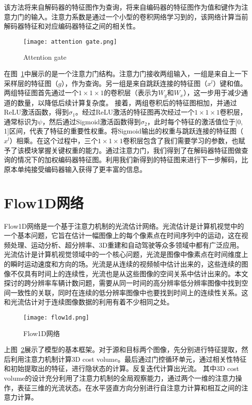 该方法将来自解码器的特征图作为查询，将来自编码器的特征图作为值和键作为注意力门的输入。注意力系数是通过一个小型的卷积网络学习到的，该网络计算当前解码器特征和对应编码器特征之间的相关性。
\begin{figure}[h]
  \centering
  \texttt{[image: attention gate.png]}
  \caption{Attention gate}
  \label{fig:attentiongate}
\end{figure}


在图~\ref{fig:attentiongate}中展示的是一个注意力门结构。注意力门接收两组输入，一组是来自上一下采样层的特征图（\(g\)），作为查询。另一组是来自跳跃连接的特征图（\(x^l\)）键和值。
两组特征图首先通过一个\(1 \times 1 \times 1\)的卷积层（表示为\(W_g\)和\(W_x\)），这一步用于减少通道的数量，以降低后续计算复杂度。
接着，两组卷积后的特征图相加，并通过ReLU激活函数，得到\( \sigma_1\)。经过ReLU激活的特征图再次经过一个\(1 \times 1 \times 1\)卷积层，通常标识为\(\psi\)，然后通过Sigmoid激活函数得到\( \sigma_2\)，此时每个特征的激活值位于[0, 1]区间，代表了特征的重要性权重。将Sigmoid输出的权重与跳跃连接的特征图（\(x^l\)）相乘。在这个过程中，三个\(1 \times 1 \times 1\)卷积层包含了我们需要学习的参数，也赋予了该模块掌握关键权重的能力。通过注意力门，我们得到了在解码器特征图做查询的情况下的加权编码器特征图。利用我们新得到的特征图来进行下一步解码，比原本单纯接受编码器输入获得了更丰富的信息。

\section{Flow1D网络}
Flow1D\cite{2022ComparisonPoolingMethodsConvolutionalNeuralNetworks}网络是一个基于注意力机制的光流估计网络。光流估计是计算机视觉中的一个基本问题，它旨在估计一幅图像上的每个像素点在时间序列中的运动，这在视频处理、运动分析、超分辨率、3D重建和自动驾驶等众多领域中都有广泛应用。光流估计是计算机视觉领域中的一个核心问题，光流是图像中像素点在时间维度上的瞬时运动速度和方向的场。光流是从连续的视频帧中估计出来的，这些连续的图像不仅具有时间上的连续性，光流也是从这些图像的空间关系中估计出来的。本文探讨的跨分辨率车辆计数问题，需要从同一时间的高分辨率低分辨率图像中找到空间一致性的关联，同时在连续的低分辨率图像中也要找到时间上的连续性关系。这和光流估计对于连续图像数据的利用有着不少相同之处。

\begin{figure}[h]
  \centering
  \texttt{[image: flow1d.png]}
  \caption{Flow1D网络}
  \label{fig:Flow1D}
\end{figure}

上图~\ref{fig:Flow1D}展示了模型的基本框架。对于源和目标两个图像，先分别进行特征提取，然后利用注意力机制计算3D cost volume。最后通过门控循环单元，通过相关性特征和初始提取出的特征，进行隐状态的计算。反复迭代计算出光流。
其中3D cost volume的设计充分利用了注意力机制的全局观察能力，通过两个一维的注意力操作，表征三维的光流状态。在水平竖直方向分别进行自注意力计算和相互之间的注意力计算。

